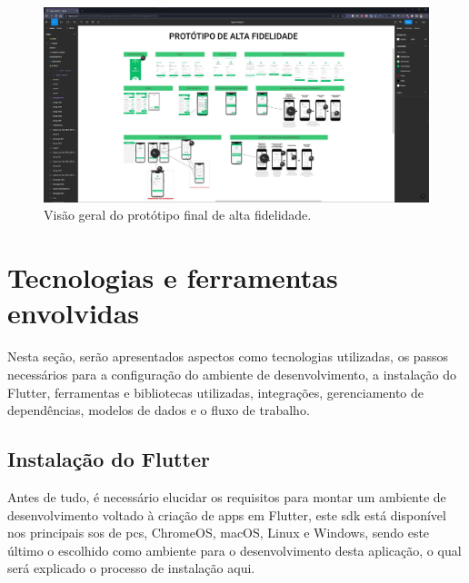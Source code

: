 \begin{figure}[H]
\centering
  \includegraphics[width=\columnwidth]{images/prototipo_alta.pdf}
  \caption{Visão geral do protótipo final de alta fidelidade.}
  \label{fig:prototipo_alta}
\end{figure}


\section{Tecnologias e ferramentas envolvidas}\label{sec:detalhes_tec}
Nesta seção, serão apresentados aspectos como tecnologias utilizadas, os passos necessários para a configuração do ambiente de desenvolvimento, a instalação do Flutter, ferramentas e bibliotecas utilizadas, integrações, gerenciamento de dependências, modelos de dados e o fluxo de trabalho.

\subsection{Instalação do Flutter}\label{ssec:instalacao_flutter}
Antes de tudo, é necessário elucidar os requisitos para montar um ambiente de desenvolvimento voltado à criação de \acp{app} em Flutter, este \ac{sdk} está disponível nos principais \acp{so} de \acp{pc}, ChromeOS, macOS, Linux e Windows, sendo este último o escolhido como ambiente para o desenvolvimento desta aplicação, o qual será explicado o processo de instalação aqui.

